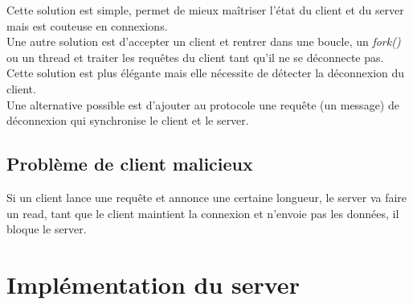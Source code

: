 \documentclass[a4paper,12pt]{article}
\begin{document}
Cette solution est simple, permet de mieux maîtriser l'état du client et du server mais est couteuse en connexions.\\

Une autre solution est d'accepter un client et rentrer dans une boucle, un \emph{fork()} ou un thread et traiter les requêtes du client tant qu'il ne se déconnecte pas. Cette solution est plus élégante mais elle nécessite de détecter la déconnexion du client.\\

Une alternative possible est d'ajouter au protocole une requête (un message) de déconnexion qui synchronise le client et le server.

\subsection*{Problème de client malicieux}

Si un client lance une requête et annonce une certaine longueur, le server va faire un read, tant que le client maintient la connexion et n'envoie pas les données, il bloque le server.\\

\section{Implémentation du server}
 
\end{document}
